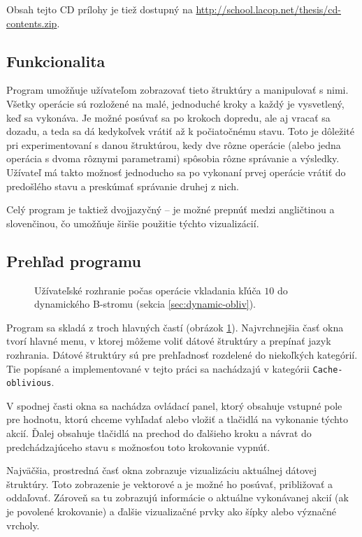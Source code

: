 Obsah tejto CD prílohy je tiež dostupný na \url{http://school.lacop.net/thesis/cd-contents.zip}.

\subsection{Funkcionalita}
Program umožňuje užívateľom zobrazovať tieto štruktúry a manipulovať s nimi. Všetky operácie sú rozložené na malé, jednoduché kroky a každý je vysvetlený, keď sa vykonáva. Je možné posúvať sa po krokoch dopredu, ale aj vracať sa dozadu, a teda sa dá kedykoľvek vrátiť až k počiatočnému stavu. Toto je dôležité pri experimentovaní s danou štruktúrou, kedy dve rôzne operácie (alebo jedna operácia s dvoma rôznymi parametrami) spôsobia rôzne správanie a výsledky. Užívateľ má takto možnosť jednoducho sa po vykonaní prvej operácie vrátiť do predošlého stavu a preskúmať správanie druhej z nich.

Celý program je taktiež dvojjazyčný -- je možné prepnúť medzi angličtinou a slovenčinou, čo umožňuje širšie použitie týchto vizualizácií.

\subsection{Prehľad programu}
\begin{figure}
    \centering
    \resizebox{0.9\textwidth}{!}{%
            
    }
    \caption[Užívateľské rozhranie]{Užívateľské rozhranie počas operácie vkladania kľúča $10$ do dynamického \obliv B-stromu (sekcia \ref{sec:dynamic-obliv}).}
    \label{fig:ss_overview}
\end{figure}

Program sa skladá z troch hlavných častí (obrázok \ref{fig:ss_overview}). Najvrchnejšia časť okna tvorí hlavné menu, v ktorej môžeme voliť dátové štruktúry a prepínať jazyk rozhrania. Dátové štruktúry sú pre prehľadnosť rozdelené do niekoľkých kategórií. Tie popísané a implementované v tejto práci sa nachádzajú v kategórii \texttt{Cache-oblivious}.

V spodnej časti okna sa nachádza ovládací panel, ktorý obsahuje vstupné pole pre hodnotu, ktorú chceme vyhľadať alebo vložiť a tlačidlá na vykonanie týchto akcií. Ďalej obsahuje tlačidlá na prechod do ďalšieho kroku a návrat do predchádzajúceho stavu s možnosťou toto krokovanie vypnúť.

Najväčšia, prostredná časť okna zobrazuje vizualizáciu aktuálnej dátovej štruktúry. Toto zobrazenie je vektorové a je možné ho posúvať, približovať a oddaľovať. Zároveň sa tu zobrazujú informácie o aktuálne vykonávanej akcií (ak je povolené krokovanie) a ďalšie vizualizačné prvky ako šípky alebo význačné vrcholy.

